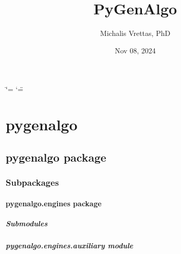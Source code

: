 \documentclass[letterpaper,10pt,english]{sphinxmanual}
\title{PyGenAlgo}
\date{Nov 08, 2024}
\author{Michalis Vrettas, PhD}
\begin{document}
\ifdefined\shorthandoff
  \ifnum\catcode`\=\string=\active\shorthandoff{=}\fi
  \ifnum\catcode`\"=\active{}\fi
\fi

\pagestyle{empty}
\sphinxmaketitle
\pagestyle{plain}
\sphinxtableofcontents
\pagestyle{normal}
\label{\detokenize{index::doc}}


\sphinxstepscope


\chapter{pygenalgo}
\label{\detokenize{modules:pygenalgo}}\label{\detokenize{modules::doc}}
\sphinxstepscope


\section{pygenalgo package}
\label{\detokenize{pygenalgo:pygenalgo-package}}\label{\detokenize{pygenalgo::doc}}

\subsection{Subpackages}
\label{\detokenize{pygenalgo:subpackages}}
\sphinxstepscope


\subsubsection{pygenalgo.engines package}
\label{\detokenize{pygenalgo.engines:pygenalgo-engines-package}}\label{\detokenize{pygenalgo.engines::doc}}

\paragraph{Submodules}
\label{\detokenize{pygenalgo.engines:submodules}}

\paragraph{pygenalgo.engines.auxiliary module}
\label{\detokenize{pygenalgo.engines:module-pygenalgo.engines.auxiliary}}\label{\detokenize{pygenalgo.engines:pygenalgo-engines-auxiliary-module}}
\end{document}
